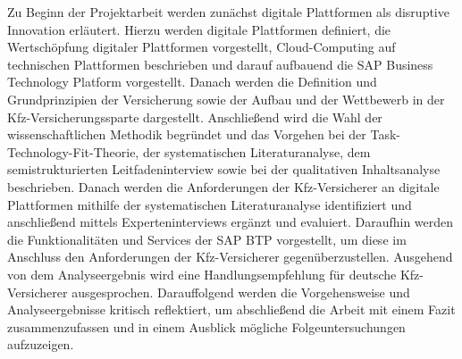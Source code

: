 
Zu Beginn der Projektarbeit werden zunächst digitale Plattformen als disruptive Innovation erläutert. Hierzu werden digitale Plattformen definiert, die Wertschöpfung digitaler Plattformen vorgestellt, Cloud-Computing auf technischen Plattformen beschrieben und darauf aufbauend die SAP Business Technology Platform vorgestellt. Danach werden die Definition und Grundprinzipien der Versicherung sowie der Aufbau und der Wettbewerb in der Kfz-Versicherungssparte dargestellt. Anschließend wird die Wahl der wissenschaftlichen Methodik begründet und das Vorgehen bei der Task-Technology-Fit-Theorie, der systematischen Literaturanalyse, dem semistrukturierten Leitfadeninterview sowie bei der qualitativen Inhaltsanalyse beschrieben. Danach werden die Anforderungen der Kfz-Versicherer an digitale Plattformen mithilfe der systematischen Literaturanalyse identifiziert und anschließend mittels Experteninterviews ergänzt und evaluiert. Daraufhin werden die Funktionalitäten und Services der SAP BTP vorgestellt, um diese im Anschluss den Anforderungen der Kfz-Versicherer gegenüberzustellen. Ausgehend von dem Analyseergebnis wird eine Handlungsempfehlung für deutsche Kfz-Versicherer ausgesprochen. Darauffolgend werden die Vorgehensweise und Analyseergebnisse kritisch reflektiert, um abschließend die Arbeit mit einem Fazit zusammenzufassen und in einem Ausblick mögliche Folgeuntersuchungen aufzuzeigen.

\newpage